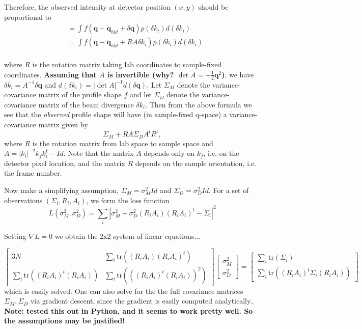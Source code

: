 \documentclass{report}
\newcommand{\bq}{\mathbf{q}}
\newcommand{\tr}{\mathrm{tr}}
\begin{document}
Therefore, the observed intensity at detector position $(x,y)$ should be proportional to
\begin{align*}
  &= \int f(\bq - \bq_{hkl} + \delta \bq) p(\delta k_i) d(\delta k_i) \\
  &= \int f(\bq - \bq_{hkl} + RA \delta k_i) p(\delta k_i) d(\delta k_i) \\
\end{align*}

where $R$ is the rotation matrix taking lab coordinates to sample-fixed coordinates.
\textbf{Assuming that $A$ is invertible (why? $\det A = -\frac{1}{2}\bq^2$)}, we have $\delta k_i = A^{-1} \delta \bq$ and $d(\delta k_i) = |\det A|^{-1} d(\delta \bq)$. Let $\Sigma_M$ denote the variance-covariance matrix of the profile shape $f$ and let $\Sigma_D$ denote the variance-covariance matrix of the beam divergence $\delta k_i$. Then from the above formula we see that the \emph{observed} profile shape will have (in sample-fixed q-space) a variance-covariance matrix given by
\[ \Sigma_M + R A \Sigma_D A^t R^t, \]
where $R$ is the rotation matrix from lab space to sample space and $A = |k_i|^{-2} k_f k_i^t - Id$.
Note that the matrix $A$ depends only on $k_f$, i.e. on the detector pixel location, and the matrix $R$ depends on the sample orientation, i.e. the frame number.




Now make a simplifying assumption, $\Sigma_M = \sigma_M^2 Id$ and $\Sigma_D = \sigma_D^2 Id$. For a set of observations $(\Sigma_i, R_i, A_i)$, we form the loss function
\[ L(\sigma_M^2, \sigma_D^2) = \sum_i |\sigma_M^2 + \sigma_D^2 (R_i A_i)(R_iA_i)^t - \Sigma_i|^2 \]

Setting $\nabla L = 0$ we obtain the 2x2 system of linear equations...



\[ \begin{bmatrix}
  3N & \sum_i \tr( (R_iA_i)(R_i A_i)^t) \\
  \sum_i \tr((R_iA_i)^t(R_i A_i)) & \sum_i \tr(((R_i A_i)^t(R_iA_i))^2)
\end{bmatrix}
\begin{bmatrix} \sigma_M^2 \\ \sigma_D^2 \end{bmatrix}
=  \begin{bmatrix} \sum_i \tr(\Sigma_i) \\ \sum_i \tr((R_i A_i)^t \Sigma_i (R_i A_i)) \end{bmatrix}  \]
which is easily solved. One can also solve for the the full covariance matrices $\Sigma_M, \Sigma_D$ via gradient descent, since the gradient is easily computed analytically.. \textbf{Note: tested this out in Python, and it seems to work pretty well. So the assumptions may be justified!}
\end{document}

